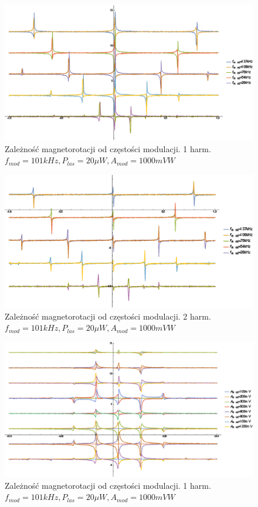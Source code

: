 \documentclass[a4paper,10pt]{article}
\begin{document}
\begin{figure}[h!]
\centering
 \includegraphics[width=\textwidth]{panoramy_1H_odf.eps}
 \caption{Zależność magnetorotacji od częstości modulacji. 1 harm. $f_{mod}=101kHz, P_{las}=20 \mu W, A_{mod}=1000mV W$}
 \label{fig:panodf1}
\end{figure}

\begin{figure}[h!]
\centering
 \includegraphics[width=\textwidth]{panoramy_2H_odf.eps}
 \caption{Zależność magnetorotacji od częstości modulacji. 2 harm. $f_{mod}=101kHz, P_{las}=20 \mu W, A_{mod}=1000mV W$}
 \label{fig:panodf2}
\end{figure}

\begin{figure}[h!]
\centering
 \includegraphics[width=\textwidth]{panoramy_1H_odam.eps}
 \caption{Zależność magnetorotacji od częstości modulacji. 1 harm. $f_{mod}=101kHz, P_{las}=20 \mu W, A_{mod}=1000mV W$}
 \label{fig:panodam1}
\end{figure}
\end{document}
